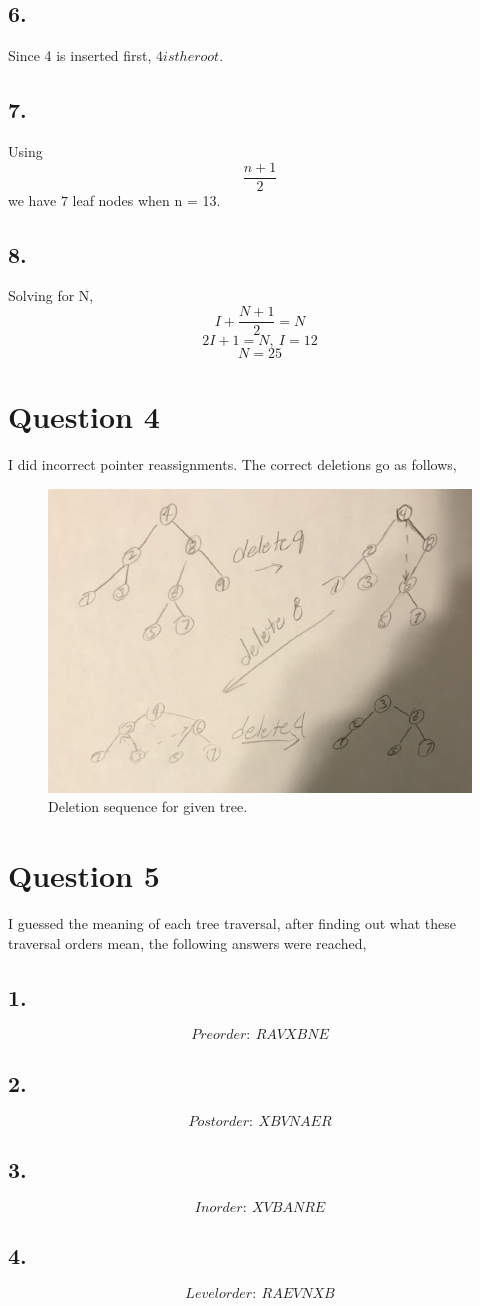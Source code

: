 \documentclass[journal]{IEEEtran}
\begin{document}
    \subsection*{6.}
    Since 4 is inserted first, $\boxed{4 is the root}$.

    \subsection*{7.}
    Using 
    \begin{equation}
        \frac{n+1}{2}
    \end{equation}
    we have $\boxed{7}$ leaf nodes when n = 13.

    \subsection*{8.}
    Solving for N,
    $$ I + \frac{N+1}{2} = N $$
    $$ 2I + 1 = N,~I=12 $$
    $$\boxed{N=25}$$

\section*{Question 4}
I did incorrect pointer reassignments. The correct deletions go as follows,
\begin{figure}[H]
    \includegraphics[scale = 0.17]{tree.png}
    \caption{Deletion sequence for given tree.}
\end{figure}

\section*{Question 5}
I guessed the meaning of each tree traversal, after finding out what these traversal orders mean,
the following answers were reached,

\subsection*{1.}
$$Preorder:~RAVXBNE$$

\subsection*{2.}
$$Postorder:~XBVNAER$$

\subsection*{3.}
$$Inorder:~XVBANRE$$

\subsection*{4.}
$$Levelorder:~RAEVNXB$$
\end{document}
